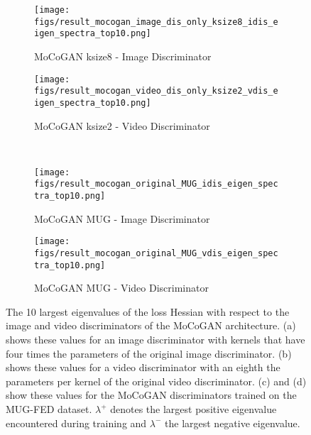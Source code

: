 \documentclass[a4paper,fleqn]{cas-sc}
\begin{document}
\begin{figure}[pos=!h]
    \centering
    \begin{subfigure}[t]{0.5\textwidth}
        \centering
        \texttt{[image: figs/result\_mocogan\_image\_dis\_only\_ksize8\_idis\_eigen\_spectra\_top10.png]}
        \caption{MoCoGAN ksize8 - Image Discriminator}
        \label{fig:MoCoGAN_iDis_EV_ksize8}
    \end{subfigure}\begin{subfigure}[t]{0.5\textwidth}
        \centering
        \texttt{[image: figs/result\_mocogan\_video\_dis\_only\_ksize2\_vdis\_eigen\_spectra\_top10.png]}
        \caption{MoCoGAN ksize2 - Video Discriminator}
        \label{fig:MoCoGAN_vDis_EV_ksize2}
    \end{subfigure}\\
    \begin{subfigure}[t]{0.5\textwidth}
        \centering
        \texttt{[image: figs/result\_mocogan\_original\_MUG\_idis\_eigen\_spectra\_top10.png]}
        \caption{MoCoGAN MUG - Image Discriminator}
        \label{fig:MoCoGAN_iDis_EV_MUG}
    \end{subfigure}\begin{subfigure}[t]{0.5\textwidth}
        \centering
        \texttt{[image: figs/result\_mocogan\_original\_MUG\_vdis\_eigen\_spectra\_top10.png]}
        \caption{MoCoGAN MUG - Video Discriminator}
        \label{fig:MoCoGAN_vDis_EV_MUG}
    \end{subfigure}\caption{The 10 largest eigenvalues of the loss Hessian with respect to the image and video discriminators of the MoCoGAN architecture. (a) shows these values for an image discriminator with kernels that have four times the parameters of the original image discriminator. (b) shows these values for a video discriminator with an eighth the parameters per kernel of the original video discriminator. (c) and (d) show these values for the MoCoGAN discriminators trained on the MUG-FED dataset. $\lambda^{+}$ denotes the largest positive eigenvalue encountered during training and $\lambda^{-}$ the largest negative eigenvalue.} 
    \label{fig:MoCoGAN_Dis_EV2}
\end{figure}
\end{document}
